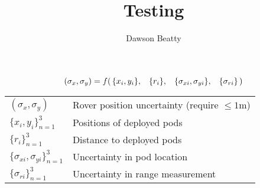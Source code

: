 \documentclass[10pt,letterpaper]{article}
\title{Testing}
\author{Dawson Beatty}
\begin{document}

\begin{equation*}
    (\sigma_x, \sigma_y) = f(\, \{ x_i, y_i \}, \hspace{.3cm} \{ r_i \},\hspace{.3cm} \{ \sigma_{xi}, \sigma_{yi} \}, \hspace{.3cm} \{\sigma_{ri} \} \,)
\end{equation*}

\vspace{1cm}

\renewcommand{\arraystretch}{1.5} 
\begin{tabular}{ll}
    $(\sigma_x, \sigma_y)$ & Rover position uncertainty (require $\leq 1$m) \\
    $\{ x_i, y_i \}_{n=1}^3$ & Positions of deployed pods \\  %
    $\{ r_i \}_{n=1}^3$ & Distance to deployed pods \\ %
    $\{ \sigma_{xi}, \sigma_{yi} \}_{n=1}^3$ & Uncertainty in pod location \\ %
    $\{ \sigma_{ri} \}_{n=1}^3$& Uncertainty in range measurement  
\end{tabular}

\end{document}
